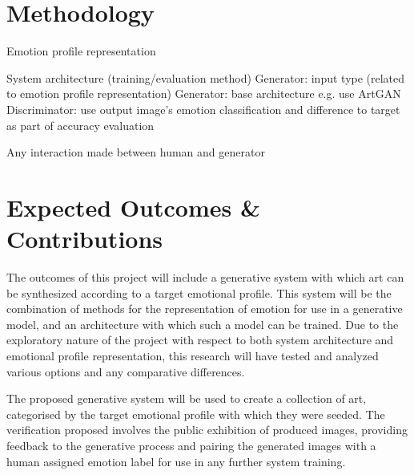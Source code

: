 \documentclass{article}
\begin{document}
\section{Methodology}

\begin{todolist}
	\item Emotion profile representation
	\item System architecture (training/evaluation method)
		\subitem Generator: input type (related to emotion profile representation)
		\subitem Generator: base architecture e.g. use ArtGAN \citep{tan2017artgan}
		\subitem Discriminator: use output image's emotion classification and difference to target as part of accuracy evaluation
	\item Any interaction made between human and generator
\end{todolist}


\section{Expected Outcomes \& Contributions}

The outcomes of this project will include a generative system with which art can be synthesized according to a target emotional profile.
This system will be the combination of methods for the representation of emotion for use in a generative model, and an architecture with which such a model can be trained.
Due to the exploratory nature of the project with respect to both system architecture and emotional profile representation, this research will have tested and analyzed various options and any comparative differences.

The proposed generative system will be used to create a collection of art, categorised by the target emotional profile with which they were seeded.
The verification proposed involves the public exhibition of produced images, providing feedback to the generative process and pairing the generated images with a human assigned emotion label for use in any further system training.




\end{document}
